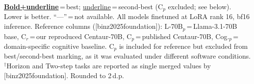 \documentclass{article}
\providecommand{\citet}[1]{[#1]}
\newlength{\ctrtblwd}
\begin{document}
\begin{table}
\begin{minipage}{\ctrtblwd}
{\tiny \underline{\textbf{Bold+underline}}\,=\,best; \underline{underline}\,=\,second-best (C$_p$ excluded; see below). Lower is better. ``---''\,=\,not available. All models finetuned at LoRA rank 16, bf16 inference. Reference columns (\citet{binz2025foundation}): L-70B$_p$\,=\,Llama-3.1-70B base, C$_r$\,=\,our reproduced Centaur-70B, C$_p$\,=\,published Centaur-70B, Cog.$_p$\,=\,domain-specific cognitive baseline. C$_p$ is included for reference but excluded from best/second-best marking, as it was evaluated under different software conditions. $^\dagger$Horizon and Two-step tasks are reported as single merged values by \citet{binz2025foundation}. Rounded to 2\,d.p.}
\end{minipage}
\captionsetup{width=\ctrtblwd}
\caption{Per-experiment NLL on Psych-101 for all four finetuned families (bf16, LoRA rank 16). Cell colour encodes performance (green\,=\,better).}
\label{tab:heatmap_ft_bf16_all}
\end{table}
\end{document}
